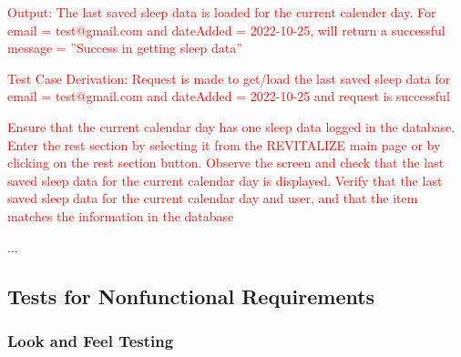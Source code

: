 \documentclass[12pt, titlepage]{article}
\begin{document}
\begin{enumerate}
	\textcolor{red}{Output: The last saved sleep data is loaded for the current calender day. For email = test@gmail.com and dateAdded = 2022-10-25, will return a successful message = ”Success in getting sleep data”}
	
	\textcolor{red}{Test Case Derivation: Request is made to get/load the last saved sleep data for email = test@gmail.com and dateAdded = 2022-10-25 and request is successful}
	
	\textcolor{red}{Ensure that the current calendar day has one sleep data logged in the database. Enter the rest section by selecting it from the REVITALIZE main page or by clicking on the rest section button. Observe the screen and check that the last saved sleep data for the current calendar day is displayed. Verify that the last saved sleep data for the current calendar day and user, and that the item matches the information in the database}
	
\end{enumerate}
...

\subsection{Tests for Nonfunctional Requirements}

\subsubsection{Look and Feel Testing}
\end{document}
